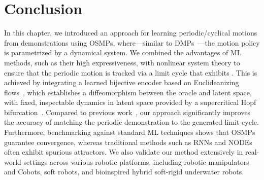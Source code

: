 \section{Conclusion}
In this chapter, we introduced an approach for learning periodic/cyclical motions from demonstrations using \glspl{OSMP}, where—similar to \glspl{DMP}~\citep{ijspeert2002learning, ijspeert2013dynamical}—the motion policy is parametrized by a dynamical system. We combined the advantages of \gls{ML} methods, such as their high expressiveness, with nonlinear system theory to ensure that the periodic motion is tracked via a limit cycle that exhibits . This is achieved by integrating a learned bijective encoder based on Euclideanizing flows~\citep{dinh2016density, rana2020euclideanizing}, which establishes a diffeomorphism between the oracle and latent space, with fixed, inspectable dynamics in latent space provided by a supercritical Hopf bifurcation~\citep{strogatz2018nonlinear}. Compared to previous work~\citep{zhi2024teaching}, our approach significantly improves the accuracy of matching the periodic demonstration to the generated limit cycle. Furthermore, benchmarking against standard \gls{ML} techniques shows that \glspl{OSMP} guarantee convergence, whereas traditional methods such as \glspl{RNN} and \glspl{NODE}~\citep{zhi2024teaching} often exhibit spurious attractors. We also validate our method extensively in real-world settings across various robotic platforms, including robotic manipulators and \glspl{Cobot}, soft robots, and bioinspired hybrid soft-rigid underwater robots.

